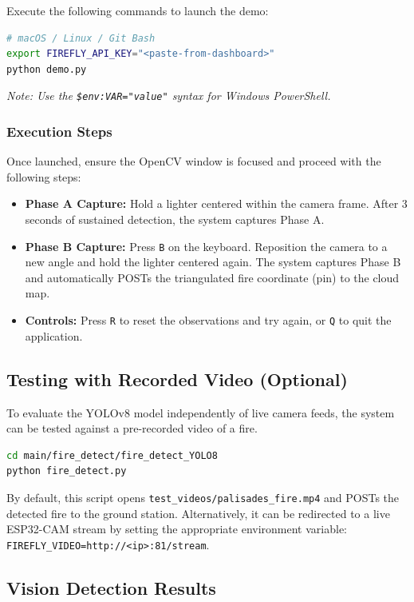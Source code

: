 \documentclass[journal, onecolumn]{IEEEtran}
\begin{document}
Execute the following commands to launch the demo:
\begin{lstlisting}[language=bash, caption={Launching the Indoor Demo}]
# macOS / Linux / Git Bash
export FIREFLY_API_KEY="<paste-from-dashboard>"
python demo.py
\end{lstlisting}
\textit{Note: Use the \texttt{\$env:VAR="value"} syntax for Windows PowerShell.}

\subsubsection{Execution Steps}
Once launched, ensure the OpenCV window is focused and proceed with the following steps:
\begin{itemize}
    \item \textbf{Phase A Capture:} Hold a lighter centered within the camera frame. After 3 seconds of sustained detection, the system captures Phase A.
    \item \textbf{Phase B Capture:} Press \texttt{B} on the keyboard. Reposition the camera to a new angle and hold the lighter centered again. The system captures Phase B and automatically POSTs the triangulated fire coordinate (pin) to the cloud map.
    \item \textbf{Controls:} Press \texttt{R} to reset the observations and try again, or \texttt{Q} to quit the application.
\end{itemize}

\subsection{Testing with Recorded Video (Optional)}
To evaluate the YOLOv8 model independently of live camera feeds, the system can be tested against a pre-recorded video of a fire.

\begin{lstlisting}[language=bash, caption={Running the YOLOv8 Video Detector}]
cd main/fire_detect/fire_detect_YOLO8
python fire_detect.py
\end{lstlisting}

By default, this script opens \texttt{test\_videos/palisades\_fire.mp4} and POSTs the detected fire to the ground station. Alternatively, it can be redirected to a live ESP32-CAM stream by setting the appropriate environment variable: \texttt{FIREFLY\_VIDEO=http://<ip>:81/stream}.


\subsection{Vision Detection Results}
\end{document}
